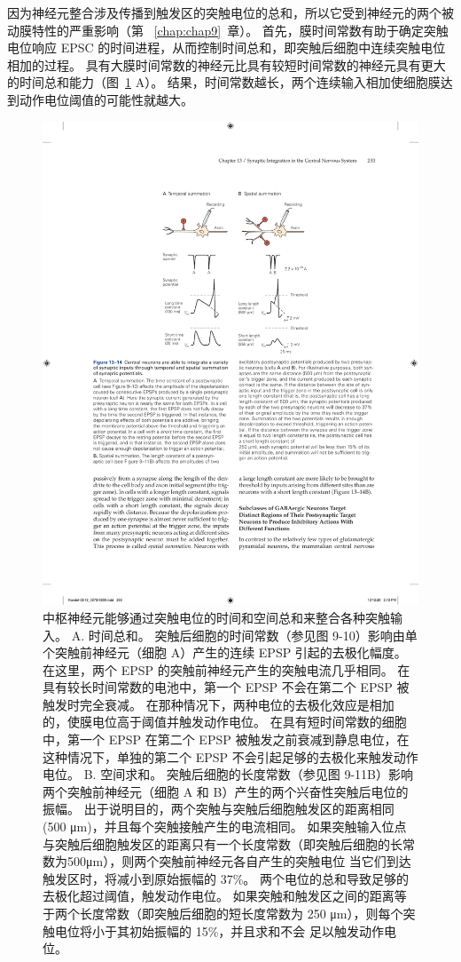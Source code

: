 因为神经元整合涉及传播到触发区的突触电位的总和，所以它受到神经元的两个被动膜特性的严重影响（第  ~\ref{chap:chap9}~章）。
首先，膜时间常数有助于确定突触电位响应 EPSC 的时间进程，从而控制时间总和，即突触后细胞中连续突触电位相加的过程。
具有大膜时间常数的神经元比具有较短时间常数的神经元具有更大的时间总和能力（图~\ref{fig:13_14} A）。
结果，时间常数越长，两个连续输入相加使细胞膜达到动作电位阈值的可能性就越大。


\begin{figure}[htbp]
	\centering
	\includegraphics[width=0.6\linewidth]{chap13/fig_13_14}
	\caption{中枢神经元能够通过突触电位的时间和空间总和来整合各种突触输入。 A. 时间总和。 突触后细胞的时间常数（参见图 9-10）影响由单个突触前神经元（细胞 A）产生的连续 EPSP 引起的去极化幅度。 在这里，两个 EPSP 的突触前神经元产生的突触电流几乎相同。 在具有较长时间常数的电池中，第一个 EPSP 不会在第二个 EPSP 被触发时完全衰减。 在那种情况下，两种电位的去极化效应是相加的，使膜电位高于阈值并触发动作电位。 在具有短时间常数的细胞中，第一个 EPSP 在第二个 EPSP 被触发之前衰减到静息电位，在这种情况下，单独的第二个 EPSP 不会引起足够的去极化来触发动作电位。 B. 空间求和。 突触后细胞的长度常数（参见图 9-11B）影响两个突触前神经元（细胞 A 和 B）产生的两个兴奋性突触后电位的振幅。 出于说明目的，两个突触与突触后细胞触发区的距离相同 (500 μm)，并且每个突触接触产生的电流相同。 如果突触输入位点与突触后细胞触发区的距离只有一个长度常数（即突触后细胞的长常数为500μm），则两个突触前神经元各自产生的突触电位 当它们到达触发区时，将减小到原始振幅的 37\%。 两个电位的总和导致足够的去极化超过阈值，触发动作电位。 如果突触和触发区之间的距离等于两个长度常数（即突触后细胞的短长度常数为 250 μm），则每个突触电位将小于其初始振幅的 15\%，并且求和不会 足以触发动作电位。}
	\label{fig:13_14}
\end{figure}


